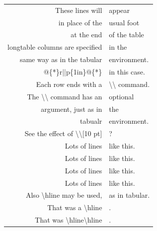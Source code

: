 \documentclass{ctexart}
\begin{document}
\begin{longtable}{@{*}r||p{1in}@{*}}
                \hline
                These lines will&appear\\
                in place of the&usual foot\\
                at the end&of the table\\
                \hline
                \endlastfoot
            
            \textsf{longtable} columns are specified&in the\\
            same way as in the \textsf{tabular}&environment.\\
            \textsf{@\{*\}r||p\{1in\}@\{*\}}&in this case.\\
            Each row ends with a&\textsf{\textbackslash\textbackslash} command.\\
            The \textsf{\textbackslash\textbackslash} command has an&optional\\
            argument, just as in&the\\
            \textsf{tabualr}&environment.\\[10pt]
            See the effect of \textsf{\textbackslash\textbackslash[10 pt]}&?\\
            Lots of lines&like this.\\
            Lots of lines&like this.\\
            Lots of lines&like this.\\
            Lots of lines&like this.\\
            Also \textsf{\textbackslash{}hline} may be used,&as in \textsf{tabular}.\\
            \hline
            That was a \textsf{\textbackslash{}hline}&.\\
            \hline\hline
            That was \textsf{\textbackslash{}hline\textbackslash{}hline}&.\\

\end{longtable}
\end{document}
